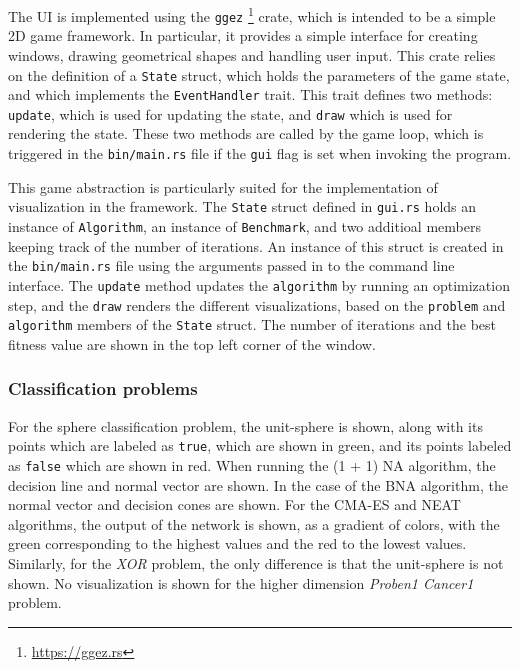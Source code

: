 The UI is implemented using the \texttt{ggez} \footnote{\url{https://ggez.rs}} crate, which is intended to be a simple 2D game framework.
In particular, it provides a simple interface for creating windows, drawing geometrical shapes and handling user input.
This crate relies on the definition of a \texttt{State} struct, which holds the parameters of the game state, and which implements the \texttt{EventHandler} trait.
This trait defines two methods: \texttt{update}, which is used for updating the state, and \texttt{draw} which is used for rendering the state.
These two methods are called by the game loop, which is triggered in the \texttt{bin/main.rs} file if the \texttt{gui} flag is set when invoking the program.

This game abstraction is particularly suited for the implementation of visualization in the framework.
The \texttt{State} struct defined in \texttt{gui.rs} holds an instance of \texttt{Algorithm}, an instance of \texttt{Benchmark}, and two additioal members keeping track of
the number of iterations. An instance of this struct is created in the \texttt{bin/main.rs} file using the arguments passed in to the command line interface.
The \texttt{update} method updates the \texttt{algorithm} by running an optimization step, and the \texttt{draw} renders the different visualizations, based on
the \texttt{problem} and \texttt{algorithm} members of the \texttt{State} struct.
The number of iterations and the best fitness value are shown in the top left corner of the window.

\subsubsection{Classification problems}

For the sphere classification problem, the unit-sphere is shown, along with its points which are labeled as \texttt{true}, which are shown in green, and its points
labeled as \texttt{false} which are shown in red. When running the (1 + 1) NA algorithm, the decision line and normal vector are shown. In the case of the BNA algorithm,
the normal vector and decision cones are shown. For the CMA-ES and NEAT algorithms, the output of the network is shown, as a gradient of colors, with the green
corresponding to the highest values and the red to the lowest values.
Similarly, for the \textit{XOR} problem, the only difference is that the unit-sphere is not shown.
No visualization is shown for the higher dimension \textit{Proben1 Cancer1} problem.


